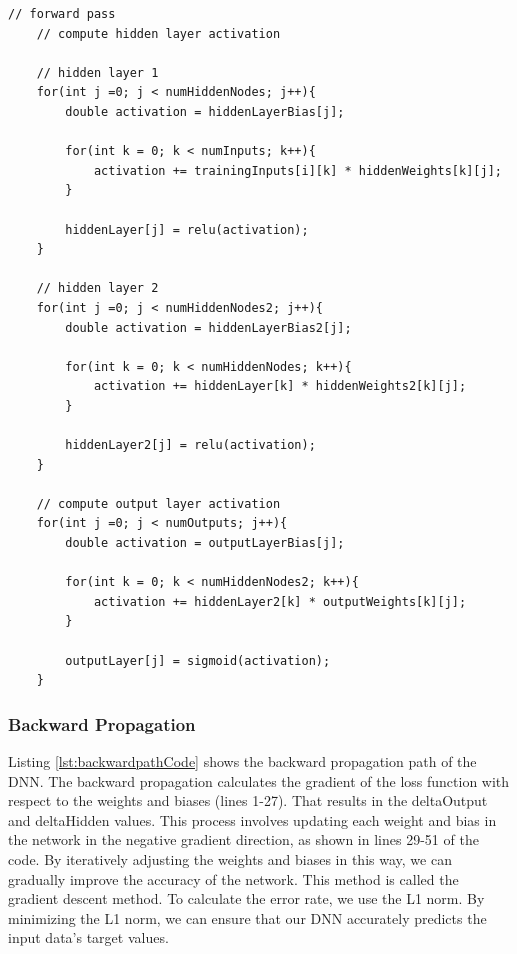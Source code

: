 \documentclass[11pt]{article}
\begin{document}
\begin{lstlisting}[style=CStyle, caption={Forward path of main.c}, label={lst:forwardpathCode}]
    // forward pass
    // compute hidden layer activation

    // hidden layer 1
    for(int j =0; j < numHiddenNodes; j++){
        double activation = hiddenLayerBias[j];

        for(int k = 0; k < numInputs; k++){
            activation += trainingInputs[i][k] * hiddenWeights[k][j];
        }

        hiddenLayer[j] = relu(activation);
    }

    // hidden layer 2
    for(int j =0; j < numHiddenNodes2; j++){
        double activation = hiddenLayerBias2[j];

        for(int k = 0; k < numHiddenNodes; k++){
            activation += hiddenLayer[k] * hiddenWeights2[k][j];
        }

        hiddenLayer2[j] = relu(activation);
    }

    // compute output layer activation
    for(int j =0; j < numOutputs; j++){
        double activation = outputLayerBias[j];

        for(int k = 0; k < numHiddenNodes2; k++){
            activation += hiddenLayer2[k] * outputWeights[k][j];
        }

        outputLayer[j] = sigmoid(activation);
    }
\end{lstlisting}

\subsubsection{Backward Propagation}
Listing \ref{lst:backwardpathCode} shows the backward propagation path of the DNN. The backward propagation calculates the gradient of the loss function with respect to the weights and biases (lines 1-27). That results in the deltaOutput and deltaHidden values. This process involves updating each weight and bias in the network in the negative gradient direction, as shown in lines 29-51 of the code. By iteratively adjusting the weights and biases in this way, we can gradually improve the accuracy of the network. This method is called the gradient descent method. To calculate the error rate, we use the L1 norm. By minimizing the L1 norm, we can ensure that our DNN accurately predicts the input data's target values.
\end{document}
